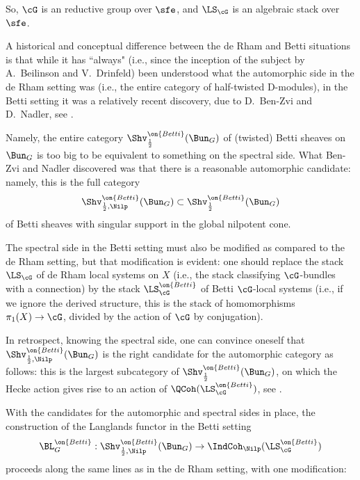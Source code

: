 \documentclass[9pt]{amsart}
\theoremstyle{remark}
\theoremstyle{definition}
\theoremstyle{remark}
\numberwithin{equation}{section}
\begin{document}
\medskip

So, $\cG$ is an reductive group over $\sfe$, and $\LS_\cG$ 
is an algebraic stack over $\sfe$.

\sssec{}

A historical and conceptual difference between the de Rham and Betti situations is that while it has ``always" 
(i.e., since the inception of the subject by A.~Beilinson and V.~Drinfeld) been 
understood what the automorphic side in the de Rham setting was (i.e., the entire category of half-twisted D-modules),
in the Betti setting it was a relatively recent discovery, due to D.~Ben-Zvi and D.~Nadler, see \cite{BZN}.  

\medskip

Namely, the entire category $\Shv^{\on{Betti}}_{\frac{1}{2}}(\Bun_G)$
of (twisted) Betti sheaves on $\Bun_G$ is too big to be equivalent
to something on the spectral side. What Ben-Zvi and Nadler discovered was that there is a reasonable automorphic candidate:
namely, this is the full category 
$$\Shv^{\on{Betti}}_{\frac{1}{2},\Nilp}(\Bun_G) \subset \Shv^{\on{Betti}}_{\frac{1}{2}}(\Bun_G)$$
of Betti sheaves with singular support in the global nilpotent cone. 

\sssec{}

The spectral side in the Betti setting must also be modified as compared to the de Rham setting,
but that modification is evident: one should replace the stack $\LS_\cG$ of de Rham local
systems on $X$ (i.e., the stack classifying $\cG$-bundles with a connection) by the stack $\LS^{\on{Betti}}_\cG$
of Betti $\cG$-local systems (i.e., if we ignore the derived structure, this is the stack of homomorphisms 
$\pi_1(X)\to \cG$, divided by the action of $\cG$ by conjugation). 

\medskip

In retrospect, knowing the spectral side, one can convince oneself that $\Shv^{\on{Betti}}_{\frac{1}{2},\Nilp}(\Bun_G)$ is the right candidate for the
automorphic category as follows: this is the largest subcategory of $\Shv^{\on{Betti}}_{\frac{1}{2}}(\Bun_G)$, on 
which the Hecke action gives rise to an action of $\QCoh(\LS_\cG^{\on{Betti}})$, see \cite[Theorem 18.1.4]{AGKRRV}. 

\sssec{}

With the candidates for the automorphic and spectral sides in place, the construction of the Langlands functor
in the Betti setting
\begin{equation} \label{e:L Betti intro}
\BL^{\on{Betti}}_G:\Shv^{\on{Betti}}_{\frac{1}{2},\Nilp}(\Bun_G) \to \IndCoh_\Nilp(\LS^{\on{Betti}}_\cG)
\end{equation} 
proceeds along the same lines as in the de Rham setting, with one modification: 
\end{document}
